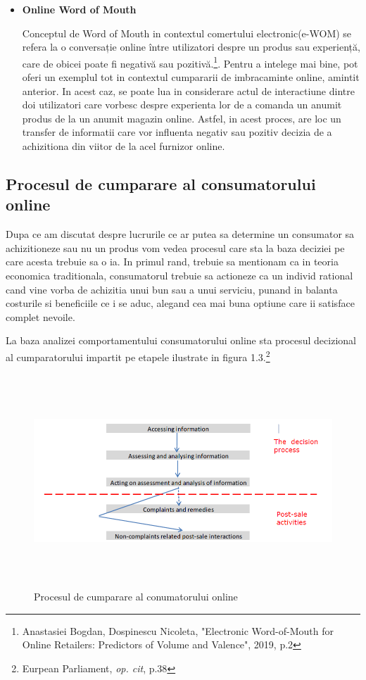 \documentclass[a4paper, 12pt]{article}
\begin{document}
\begin{itemize}
		\item\textbf{Online Word of Mouth} 
		
		\quad Conceptul de Word of Mouth in contextul comertului electronic(e-WOM) se refera la o conversație online între utilizatori despre un produs sau experiență, care de obicei poate fi negativă sau pozitivă.\footnote{Anastasiei Bogdan, Dospinescu Nicoleta, "Electronic Word-of-Mouth for Online Retailers:
			Predictors of Volume and Valence", 2019, p.2}. Pentru a intelege mai bine, pot oferi un exemplul tot in contextul cumpararii de imbracaminte online, amintit anterior. In acest caz, se poate lua in considerare actul de interactiune dintre doi utilizatori care vorbesc despre experienta lor de a comanda un anumit produs de la un anumit magazin online. Astfel, in acest proces, are loc un transfer de informatii care vor influenta negativ sau pozitiv decizia de a achizitiona din viitor de la acel furnizor online.
		
	\end{itemize}

		\subsection{Procesul de cumparare al consumatorului online}
		\quad\quad Dupa ce am discutat despre lucrurile ce ar putea sa determine un consumator sa achizitioneze sau nu un produs vom vedea procesul care sta la baza deciziei pe care acesta trebuie sa o ia. In primul rand, trebuie sa mentionam ca in teoria economica traditionala, consumatorul trebuie sa actioneze ca un individ rational cand vine vorba de achizitia unui bun sau a unui serviciu, punand in balanta costurile si beneficiile ce i se aduc, alegand cea mai buna optiune care ii satisface complet nevoile.
		
		\quad La baza analizei comportamentului consumatorului online sta procesul decizional al cumparatorului impartit pe etapele ilustrate in figura 1.3.\footnote{Eurpean Parliament, \textit{op. cit}, p.38}
		\begin{figure}[!htb]
			\centering
			\includegraphics[width=12cm, height=8cm]{"figures/third.png"}
			\caption{Procesul de cumparare al conumatorului online}\label{fig:third}
		\end{figure}
	
\end{document}
